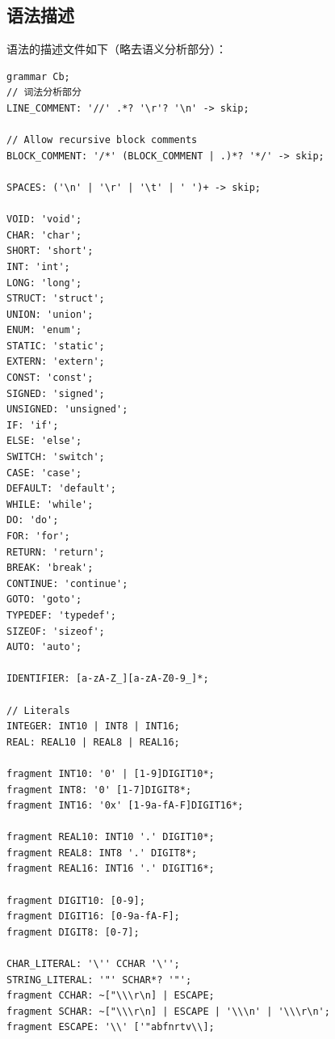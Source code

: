 \documentclass{ctexrep}
\begin{document}
\subsection{语法描述}
语法的描述文件如下（略去语义分析部分）：
\begin{verbatim}
grammar Cb;
// 词法分析部分
LINE_COMMENT: '//' .*? '\r'? '\n' -> skip;

// Allow recursive block comments
BLOCK_COMMENT: '/*' (BLOCK_COMMENT | .)*? '*/' -> skip;

SPACES: ('\n' | '\r' | '\t' | ' ')+ -> skip;

VOID: 'void';
CHAR: 'char';
SHORT: 'short';
INT: 'int';
LONG: 'long';
STRUCT: 'struct';
UNION: 'union';
ENUM: 'enum';
STATIC: 'static';
EXTERN: 'extern';
CONST: 'const';
SIGNED: 'signed';
UNSIGNED: 'unsigned';
IF: 'if';
ELSE: 'else';
SWITCH: 'switch';
CASE: 'case';
DEFAULT: 'default';
WHILE: 'while';
DO: 'do';
FOR: 'for';
RETURN: 'return';
BREAK: 'break';
CONTINUE: 'continue';
GOTO: 'goto';
TYPEDEF: 'typedef';
SIZEOF: 'sizeof';
AUTO: 'auto';

IDENTIFIER: [a-zA-Z_][a-zA-Z0-9_]*;

// Literals
INTEGER: INT10 | INT8 | INT16;
REAL: REAL10 | REAL8 | REAL16;

fragment INT10: '0' | [1-9]DIGIT10*;
fragment INT8: '0' [1-7]DIGIT8*;
fragment INT16: '0x' [1-9a-fA-F]DIGIT16*;

fragment REAL10: INT10 '.' DIGIT10*;
fragment REAL8: INT8 '.' DIGIT8*;
fragment REAL16: INT16 '.' DIGIT16*;

fragment DIGIT10: [0-9];
fragment DIGIT16: [0-9a-fA-F];
fragment DIGIT8: [0-7];

CHAR_LITERAL: '\'' CCHAR '\'';
STRING_LITERAL: '"' SCHAR*? '"';
fragment CCHAR: ~["\\\r\n] | ESCAPE;
fragment SCHAR: ~["\\\r\n] | ESCAPE | '\\\n' | '\\\r\n';
fragment ESCAPE: '\\' ['"abfnrtv\\];
\end{verbatim}
\end{document}
